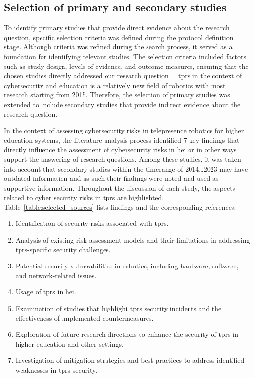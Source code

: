 \subsection{Selection of primary and secondary studies}\label{subsec:selection-of-studies}

To identify primary studies that provide direct evidence about the research question, specific selection criteria was defined during the
protocol definition stage. Although criteria was refined during the search process, it served as a foundation for identifying
relevant studies. The selection criteria included factors such as study design, levels of evidence, and outcome measures, ensuring that the
chosen studies directly addressed our research question ~\cite[10-16]{systematic_review_2004}. \ac{tprs} in the context of cybersecurity
and education is a relatively new field of robotics with most research starting from 2̃015. Therefore, the selection of primary
studies was
extended to include secondary studies that provide indirect evidence about the research question.

In the context of assessing cybersecurity risks in telepresence robotics for higher education systems, the literature analysis process
identified 7 key findings that directly influence the assessment of cybersecurity risks in \ac{hei} or in other ways support the
answering of research questions. Among
these studies, it was taken into account that secondary studies within the timerange of 2014\ldots2023 may have outdated information and
as such their findings were noted and used as supportive information. Throughout the discussion of each study, the aspects related to
cyber security risks in \ac{tprs} are highlighted. Table~\ref{table:selected_sources} lists findings and the corresponding references:

\begin{enumerate}
  \item Identification of security risks associated with \ac{tprs}. %
  \item Analysis of existing risk assessment models and their limitations in addressing \ac{tprs}-specific security challenges. %
  \item Potential security vulnerabilities in robotics, including hardware, software, and network-related issues. %
  \item Usage of \ac{tprs} in \ac{hei}. %
  \item Examination of studies that highlight \ac{tprs} security incidents and the effectiveness of implemented countermeasures. %
  \item Exploration of future research directions to enhance the security of \ac{tprs} in higher education and other settings. %
  \item Investigation of mitigation strategies and best practices to address identified weaknesses in \ac{tprs} security. %
\end{enumerate}

